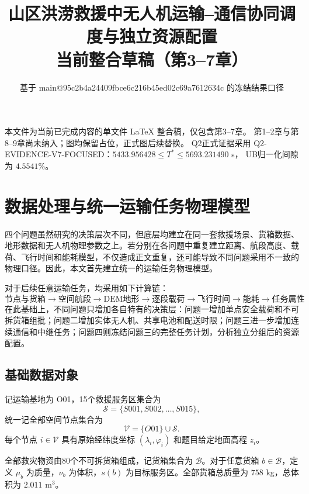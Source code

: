 \documentclass[UTF8,a4paper,12pt]{ctexart}
\title{山区洪涝救援中无人机运输--通信协同调度与独立资源配置\\
\large 当前整合草稿（第3--7章）}
\author{}
\date{基于 main@95c2b4a24409fbce6c216b45ed02c69a7612634c 的冻结结果口径}
\begin{document}
\maketitle

\begin{center}
\small
本文件为当前已完成内容的单文件 \LaTeX{} 整合稿，仅包含第3--7章。
第1--2章与第8--9章尚未纳入；图均保留占位，正式图后续替换。
Q2正式证据采用 Q2-EVIDENCE-V7-FOCUSED：$5433.956428\le T^*\le5693.231490$ s，
UB归一化间隙为 $4.5541\%$。
\end{center}

\tableofcontents
\newpage

\setcounter{section}{2}

\section{数据处理与统一运输任务物理模型}
\label{sec:foundation}

四个问题虽然研究的决策层次不同，但底层均建立在同一套救援场景、货箱数据、地形数据和无人机物理参数之上。若分别在各问题中重复建立距离、航段高度、载荷、飞行时间和能耗模型，不仅造成正文重复，还可能导致不同问题采用不一致的物理口径。因此，本文首先建立统一的运输任务物理模型。

对于后续任意运输任务，均采用如下计算链：
\[
\boxed{
\text{节点与货箱}
\rightarrow
\text{空间航段}
\rightarrow
\text{DEM地形}
\rightarrow
\text{逐段载荷}
\rightarrow
\text{飞行时间}
\rightarrow
\text{能耗}
\rightarrow
\text{任务属性}
}
\]
在此基础上，不同问题只增加各自特有的决策层：问题一增加单点安全载荷和不可拆货箱组批；问题二增加实体无人机、共享电池和配送时限；问题三进一步增加连续通信和中继任务；问题四则冻结问题三的完整任务计划，分析独立分组后的资源配置。

\subsection{基础数据对象}

记运输基地为 O01，15个救援服务区集合为
\[
\mathcal S=\{S001,S002,\ldots,S015\},
\]
统一记全部空间节点集合为
\[
\mathcal V=\{O01\}\cup\mathcal S.
\]
每个节点 $i\in\mathcal V$ 具有原始经纬度坐标 $(\lambda_i,\varphi_i)$ 和题目给定地面高程 $z_i$。

全部救灾物资由80个不可拆货箱组成，记货箱集合为 $\mathcal B$。对于任意货箱 $b\in\mathcal B$，定义 $\mu_b$ 为质量，$\nu_b$ 为体积，$s(b)$ 为目标服务区。全部货箱总质量为 $758$ kg，总体积为 $2.011$ m$^3$。
\end{document}
